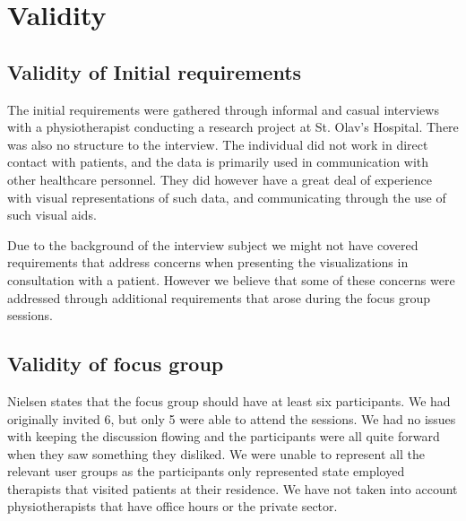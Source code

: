 \chapter{Validity}

\section{Validity of Initial requirements}
The initial requirements were gathered through informal and casual interviews with a physiotherapist conducting a research project at St. Olav's Hospital. There was also no structure to the interview. The individual did not work in direct contact with patients, and the data is primarily used in communication with other healthcare personnel. 
They did however have a great deal of experience with visual representations of such data, and communicating through the use of such visual aids.

Due to the background of the interview subject we might not have covered requirements that address concerns when presenting the visualizations in consultation with a patient. 
However we believe that some of these concerns were addressed through additional requirements that arose during the focus group sessions.

\section{Validity of focus group}
Nielsen states that the focus group should have at least six participants. We had originally invited 6, but only 5 were able to attend the sessions. We had no issues with keeping the discussion flowing and the participants were all quite forward when they saw something they disliked. We were unable to represent all the relevant user groups as the participants only represented state employed therapists that visited patients at their residence. We have not taken into account physiotherapists that have office hours or the private sector.

